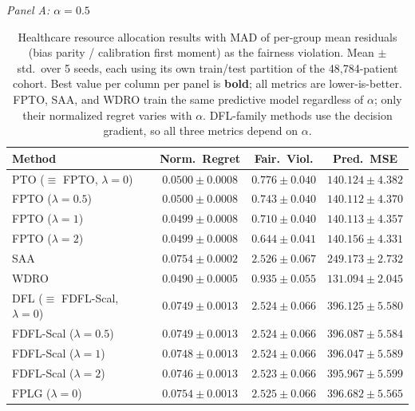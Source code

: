 \begin{table}[htbp]
\centering
\caption{Healthcare resource allocation results with MAD of per-group mean residuals (bias parity / calibration first moment) as the fairness violation. Mean $\pm$ std.\ over 5 seeds, each using its own train/test partition of the 48{,}784-patient cohort. Best value per column per panel is \textbf{bold}; all metrics are lower-is-better. FPTO, SAA, and WDRO train the same predictive model regardless of $\alpha$; only their normalized regret varies with $\alpha$. DFL-family methods use the decision gradient, so all three metrics depend on $\alpha$.}
\label{tab:healthcare-bp}
\footnotesize
\setlength{\tabcolsep}{5pt}

\smallskip
\textit{Panel A: $\alpha = 0.5$}

\smallskip
\begin{tabular}{l ccc}
\toprule
Method & Norm.\ Regret & Fair.\ Viol. & Pred.\ MSE \\
\midrule
PTO ($\equiv$ FPTO, $\lambda\!=\!0$)         & $0.0500 \pm 0.0008$ & $0.776 \pm 0.040$ & $140.124 \pm 4.382$ \\
FPTO ($\lambda\!=\!0.5$)                     & $0.0500 \pm 0.0008$ & $0.743 \pm 0.040$ & $140.112 \pm 4.370$ \\
FPTO ($\lambda\!=\!1$)                       & $0.0499 \pm 0.0008$ & $0.710 \pm 0.040$ & $140.113 \pm 4.357$ \\
FPTO ($\lambda\!=\!2$)                       & $0.0499 \pm 0.0008$ & $0.644 \pm 0.041$ & $140.156 \pm 4.331$ \\
\midrule
SAA                                          & $0.0754 \pm 0.0002$ & $2.526 \pm 0.067$ & $249.173 \pm 2.732$ \\
WDRO                                         & $\mathbf{0.0490 \pm 0.0005}$ & $0.935 \pm 0.055$ & $\mathbf{131.094 \pm 2.045}$ \\
\midrule
DFL ($\equiv$ FDFL-Scal, $\lambda\!=\!0$)    & $0.0749 \pm 0.0013$ & $2.524 \pm 0.066$ & $396.125 \pm 5.580$ \\
FDFL-Scal ($\lambda\!=\!0.5$)                & $0.0749 \pm 0.0013$ & $2.524 \pm 0.066$ & $396.087 \pm 5.584$ \\
FDFL-Scal ($\lambda\!=\!1$)                  & $0.0748 \pm 0.0013$ & $2.524 \pm 0.066$ & $396.047 \pm 5.589$ \\
FDFL-Scal ($\lambda\!=\!2$)                  & $0.0746 \pm 0.0013$ & $2.523 \pm 0.066$ & $395.967 \pm 5.599$ \\
\midrule
FPLG ($\lambda\!=\!0$)                       & $0.0754 \pm 0.0013$ & $2.525 \pm 0.066$ & $396.682 \pm 5.565$ \\

\end{tabular}
\end{table}
